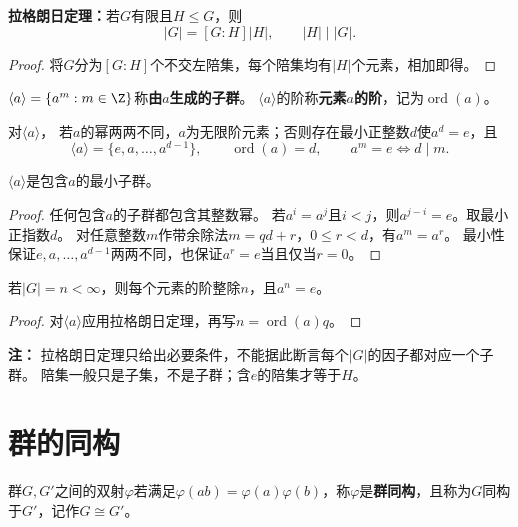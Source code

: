\begin{theorem}
\textbf{拉格朗日定理：}若$G$有限且$H\leq G$，则
\[
|G|=[G:H]|H|,\qquad |H|\mid|G|.
\]
\end{theorem}
\begin{proof}
将$G$分为$[G:H]$个不交左陪集，每个陪集均有$|H|$个元素，相加即得。
\end{proof}

\begin{definition}
\label{p2:concept:c1-l353}$\langle a\rangle=\{a^m:m\in\Z\}$称\textbf{由$a$生成的子群}。
\label{p2:concept:c1-l354}$\langle a\rangle$的阶称\textbf{元素$a$的阶}，记为$\operatorname{ord}(a)$。
\end{definition}

\begin{proposition}
对$\langle a\rangle$，
若$a$的幂两两不同，$a$为无限阶元素；否则存在最小正整数$d$使$a^d=e$，且
\[
\langle a\rangle=\{e,a,\ldots,a^{d-1}\},\qquad \operatorname{ord}(a)=d,
\qquad a^m=e\iff d\mid m.
\]

$\langle a\rangle$是包含$a$的最小子群。
\end{proposition}
\begin{proof}
任何包含$a$的子群都包含其整数幂。
若$a^i=a^j$且$i<j$，则$a^{j-i}=e$。取最小正指数$d$。
对任意整数$m$作带余除法$m=qd+r$，$0\leq r<d$，有$a^m=a^r$。
最小性保证$e,a,\ldots,a^{d-1}$两两不同，也保证$a^r=e$当且仅当$r=0$。
\end{proof}

\begin{corollary}
若$|G|=n<\infty$，则每个元素的阶整除$n$，且$a^n=e$。
\end{corollary}
\begin{proof}
对$\langle a\rangle$应用拉格朗日定理，再写$n=\operatorname{ord}(a)q$。
\end{proof}

\textbf{注：}
拉格朗日定理只给出必要条件，不能据此断言每个$|G|$的因子都对应一个子群。
陪集一般只是子集，不是子群；含$e$的陪集才等于$H$。


\section{群的同构}
\begin{definition}
\label{p2:concept:c1-l388}群$G,G'$之间的双射$\varphi$若满足$\varphi(ab)=\varphi(a)\varphi(b)$，称$\varphi$是\textbf{群同构}，且称为$G$同构于$G'$，记作$G\cong G'$。
\end{definition}

